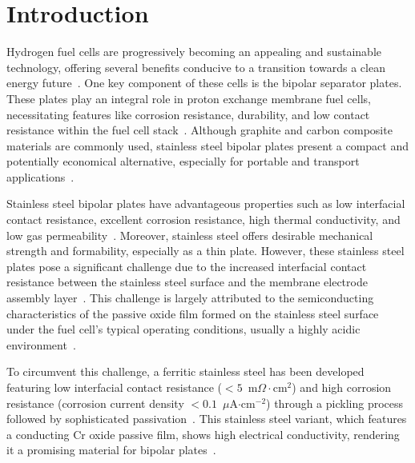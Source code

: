 \documentclass[jkps,reprint,twocolumn,showkeys]{revtex4}
\begin{document}
\section{Introduction}
Hydrogen fuel cells are progressively becoming an appealing and sustainable technology, offering several benefits conducive to a transition towards a clean energy future~\cite{schafer2006FutureFuelCell, xu2020MassApplicationsReview}.
One key component of these cells is the bipolar separator plates.
These plates play an integral role in proton exchange membrane fuel cells, necessitating features like corrosion resistance, durability, and low contact resistance within the fuel cell stack~\cite{liu2022ReviewProtonExchange}. 
Although graphite and carbon composite materials are commonly used, stainless steel bipolar plates present a compact and potentially economical alternative, especially for portable and transport applications~\cite{yi2019LifetimePredictionModel, kraytsberg2007ReducedContactResistance}.



Stainless steel bipolar plates have advantageous properties such as low interfacial contact resistance, excellent corrosion resistance, high thermal conductivity, and low gas permeability~\cite{leng2020StainlessSteelBipolar, karimi2012ReviewMetallicBipolar}. 
Moreover, stainless steel offers desirable mechanical strength and formability, especially as a thin plate. 
However, these stainless steel plates pose a significant challenge due to the increased interfacial contact resistance between the stainless steel surface and the membrane electrode assembly layer~\cite{antunes2010CorrosionMetalBipolar, kraytsberg2007ReducedContactResistance, turan2011EffectManufacturingProcesses}.
This challenge is largely attributed to the semiconducting characteristics of the passive oxide film formed on the stainless steel surface under the fuel cell's typical operating conditions, usually a highly acidic environment~\cite{shaigan2021StandardizedTestingFrameworka, olsson2003PassiveFilmsStainless, decristofaro1997InfluenceTemperaturePassivation}.


To circumvent this challenge, a ferritic stainless steel has been developed featuring low interfacial contact resistance ($< 5$~m$\Omega \cdot$cm$^2$) and high corrosion resistance (corrosion current density $< 0.1$~$\mu$A$\cdot$cm$^{-2}$) through a pickling process followed by sophisticated passivation~\cite{kim2021posco}.
This stainless steel variant, which features a conducting Cr oxide passive film, shows high electrical conductivity, rendering it a promising material for bipolar plates~\cite{liu2022ReviewProtonExchange, leng2021ImprovementCorrosionResistance}.
\end{document}
